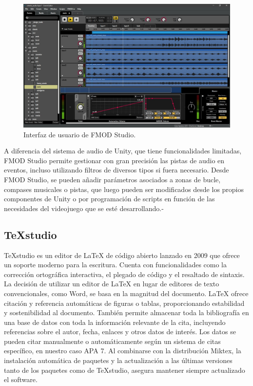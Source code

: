 \begin{figure}[h!]
	\centering
	\includegraphics[width=0.6\linewidth]{./Figuras/Aspectos/FMODStudio.jpg}
	\caption{Interfaz de usuario de FMOD Studio.}
	\label{fig:FMODUI}
\end{figure}

A diferencia del sistema de audio de Unity, que tiene funcionalidades limitadas, FMOD Studio permite gestionar con gran precisión las pistas de audio en eventos, incluso utilizando filtros de diversos tipos si fuera necesario. Desde FMOD Studio, se pueden añadir parámetros asociados a zonas de bucle, compases musicales o pistas, que luego pueden ser modificados desde los propios componentes de Unity o por programación de scripts en función de las necesidades del videojuego que se esté desarrollando.-

\subsection{TeXstudio}

TeXstudio es un editor de LaTeX de código abierto lanzado en 2009 que ofrece un soporte moderno para la escritura. Cuenta con funcionalidades como la corrección ortográfica interactiva, el plegado de código y el resaltado de sintaxis. La decisión de utilizar un editor de LaTeX en lugar de editores de texto convencionales, como Word, se basa en la magnitud del documento. LaTeX ofrece citación y referencia automáticas de figuras o tablas, proporcionando estabilidad y sostenibilidad al documento. También permite almacenar toda la bibliografía en una base de datos con toda la información relevante de la cita, incluyendo referencias sobre el autor, fecha, enlaces y otros datos de interés. Los datos se pueden citar manualmente o automáticamente según un sistema de citas específico, en nuestro caso APA 7. Al combinarse con la distribución Miktex, la instalación automática de paquetes y la actualización a las últimas versiones tanto de los paquetes como de TeXstudio, asegura mantener siempre actualizado el software.

